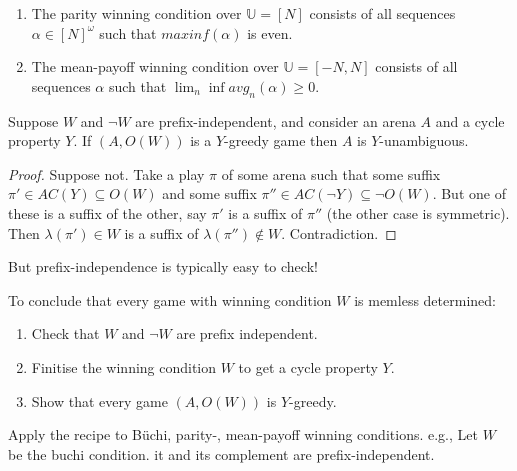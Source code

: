 \documentclass[a4paper,10pt]{article}
\begin{document}
\begin{example}
 \begin{enumerate}
\item The parity winning condition over $\mathbb{U} = [N]$ consists of all sequences $\alpha \in [N]^\omega$ such that $max inf(\alpha)$ is even.
\item The mean-payoff winning condition over $\mathbb{U} = [-N,N]$ consists of all sequences $\alpha$ such that $\lim_n \inf avg_n(\alpha) \geq 0$.
 \end{enumerate}
 
\end{example}


\begin{lemma}
Suppose $W$ and $\neg W$ are prefix-independent, and consider an arena $A$ and a cycle property $Y$. If $(A,O(W))$ is a $Y$-greedy game then $A$ is $Y$-unambiguous.
\end{lemma}

\begin{proof}
Suppose not. Take a play $\pi$ of some arena such that some suffix $\pi' \in AC(Y) \subseteq O(W)$ and some suffix $\pi'' \in AC(\neg Y) \subseteq \neg O(W)$. But one of these is a suffix of the other, say $\pi'$ is a suffix of $\pi''$ (the other case is symmetric). Then $\lambda(\pi') \in W$ is a suffix of $\lambda(\pi'') \not \in W$. 
Contradiction.
\end{proof}

But prefix-independence is typically easy to check! 

\begin{framed}
To conclude that every game with winning condition $W$ is memless determined:
\begin{enumerate}
\item Check that $W$ and $\neg W$ are prefix independent.

\item Finitise the winning condition $W$ to get a cycle property $Y$.

\item Show that every game $(A,O(W))$ is $Y$-greedy.
\end{enumerate}
\end{framed}

\begin{example}
Apply the recipe to B\"uchi, parity-, mean-payoff winning conditions.
e.g., Let $W$ be the buchi condition. it and its complement are prefix-independent.
\end{example}
 
\end{document}
